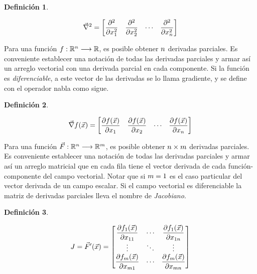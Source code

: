 \documentclass[a5paper,12pt,twoside]{book}
\newtheorem{defn}{{Definición}}[chapter]
\begin{document}
\begin{mdframed}[style=MyFrame1]
    \begin{defn}
    \end{defn}
    \begin{equation*}
        \Vec{\nabla}^2 = \begin{bmatrix} \dfrac{\partial^2}{\partial x_1^2} & \dfrac{\partial^2}{\partial x_2^2} & \cdots & \dfrac{\partial^2}{\partial x_n^2} \end{bmatrix}
    \end{equation*}
\end{mdframed}

Para una función $f:\mathbb{R}^n \longrightarrow \mathbb{R}$, es posible obtener $n$ derivadas parciales. Es conveniente establecer una notación de todas las derivadas parciales y armar así un arreglo vectorial con una derivada parcial en cada componente. Si la función es \emph{diferenciable}, a este vector de las derivadas se lo llama gradiente, y se define con el operador nabla como sigue.

\begin{mdframed}[style=MyFrame1]
    \begin{defn}
    \end{defn}
    \begin{equation*}
        \Vec{\nabla} f(\Vec{x}) = \begin{bmatrix} \dfrac{\partial f(\Vec{x})}{\partial x_1} & \dfrac{\partial f(\Vec{x})}{\partial x_2} & \cdots & \dfrac{\partial f(\Vec{x})}{\partial x_n} \end{bmatrix}
    \end{equation*}
\end{mdframed}

Para una función $\Vec{F}:\mathbb{R}^n \longrightarrow \mathbb{R}^m$, es posible obtener $n \times m$ derivadas parciales. Es conveniente establecer una notación de todas las derivadas parciales y armar así un arreglo matricial que en cada fila tiene el vector derivada de cada función-componente del campo vectorial. Notar que si $m=1$ es el caso particular del vector derivada de un campo escalar. Si el campo vectorial es diferenciable la matriz de derivadas parciales lleva el nombre de \emph{Jacobiano}.

\begin{mdframed}[style=MyFrame1]
    \begin{defn}
    \end{defn}
    \begin{equation*}
        J = \Vec{F}'(\Vec{x}) = 
        \begin{bmatrix}
            \dfrac{\partial f_1(\Vec{x})}{\partial x_{11}} & \cdots & \dfrac{\partial f_1(\Vec{x})}{\partial x_{1n}}
            \\
            \vdots & \ddots & \vdots
            \\
            \dfrac{\partial f_m(\Vec{x})}{\partial x_{m 1}} & \cdots & \dfrac{\partial f_m(\Vec{x})}{\partial x_{mn}}
        \end{bmatrix}
    \end{equation*}
\end{mdframed}
\end{document}
